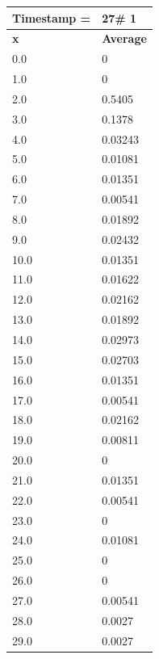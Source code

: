 \begin{tabular}{|l||l|}
\hline
\textbf{Timestamp =} & \textbf{27}\# 1\\\hline
	\textbf{x} & \textbf{Average} \\ \hline
\hline
	0.0 & 0 \\ \hline
	1.0 & 0 \\ \hline
	2.0 & 0.5405 \\ \hline
	3.0 & 0.1378 \\ \hline
	4.0 & 0.03243 \\ \hline
	5.0 & 0.01081 \\ \hline
	6.0 & 0.01351 \\ \hline
	7.0 & 0.00541 \\ \hline
	8.0 & 0.01892 \\ \hline
	9.0 & 0.02432 \\ \hline
	10.0 & 0.01351 \\ \hline
	11.0 & 0.01622 \\ \hline
	12.0 & 0.02162 \\ \hline
	13.0 & 0.01892 \\ \hline
	14.0 & 0.02973 \\ \hline
	15.0 & 0.02703 \\ \hline
	16.0 & 0.01351 \\ \hline
	17.0 & 0.00541 \\ \hline
	18.0 & 0.02162 \\ \hline
	19.0 & 0.00811 \\ \hline
	20.0 & 0 \\ \hline
	21.0 & 0.01351 \\ \hline
	22.0 & 0.00541 \\ \hline
	23.0 & 0 \\ \hline
	24.0 & 0.01081 \\ \hline
	25.0 & 0 \\ \hline
	26.0 & 0 \\ \hline
	27.0 & 0.00541 \\ \hline
	28.0 & 0.0027 \\ \hline
	29.0 & 0.0027 \\ \hline
\end{tabular}

